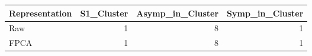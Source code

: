 
\begin{tabular}{lrrr}
\toprule
Representation & S1\_Cluster & Asymp\_in\_Cluster & Symp\_in\_Cluster\\
\midrule
Raw & 1 & 8 & 1\\
FPCA & 1 & 8 & 1\\
\bottomrule
\end{tabular}
